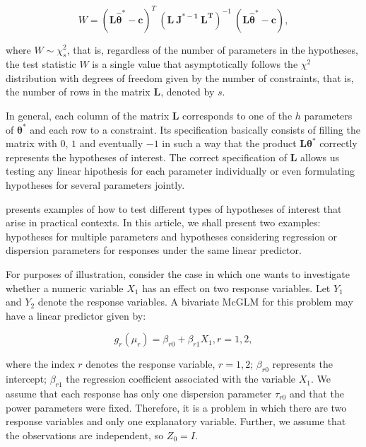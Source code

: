\documentclass[article]{jss}\usepackage[]{graphicx}\usepackage[]{xcolor}
\begin{document}
$$
W = (\boldsymbol{L\hat\theta^{*}} - \boldsymbol{c})^T \ (\boldsymbol{L \ J^{\boldsymbol{*}-1} \ L^T})^{-1} \ (\boldsymbol{L\hat\theta^{*}} - \boldsymbol{c}),
$$

\noindent where $W \sim \chi^2_s$, that is, regardless of the number of parameters in the hypotheses, the test statistic $W$ is a single value that asymptotically follows the $\chi^2$ distribution with degrees of freedom given by the number of constraints, that is, the number of rows in the matrix $\boldsymbol{L}$, denoted by $s$.

In general, each column of the matrix $\boldsymbol{L}$ corresponds to one of the $h$ parameters of $\boldsymbol{\theta^{*}}$ and each row to a constraint. Its specification basically consists of filling the matrix with $0$, $1$ and eventually $-1$ in such a way that the product $\boldsymbol{L}\boldsymbol{\theta^{*}}$ correctly represents the hypotheses of interest. The correct specification of $\boldsymbol{L}$ allows us testing any linear hipothesis for each parameter individually or even formulating hypotheses for several parameters jointly.

\citet{htmcglm_proposta} presents examples of how to test different types of hypotheses of interest that arise in practical contexts. In this article, we shall present two examples: hypotheses for multiple parameters and hypotheses considering regression or dispersion parameters for responses under the same linear predictor.

For purposes of illustration, consider the case in which one wants to investigate whether a numeric variable $X_1$ has an effect on two response variables. Let $Y_1$ and $Y_2$ denote the response variables. A bivariate McGLM for this problem may have a linear predictor given by:

\begin{equation}
\label{eq:pred_ex}
g_r(\mu_r) = \beta_{r0} + \beta_{r1} X_1, r=1,2,
\end{equation}

\noindent where the index $r$ denotes the response variable, $r = 1,2$; $\beta_{r0}$ represents the intercept; $\beta_{r1}$ the regression coefficient associated with the variable $X_1$. We assume that each response has only one dispersion parameter $\tau_{r0}$ and that the power parameters were fixed. Therefore, it is a problem in which there are two response variables and only one explanatory variable. Further, we assume that the observations are independent, so $Z_0 = I$. 
\end{document}
